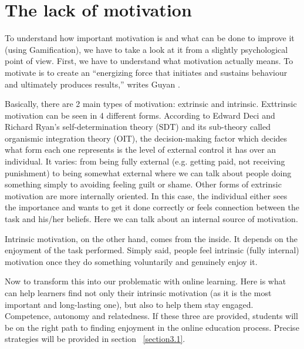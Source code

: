 \documentclass[10pt,english,a4paper]{article}
\begin{document}
\section{The lack of motivation} \label{section2}
	To understand how important motivation is and what can be done to improve it (using Gamification), we have to take a look at it from a slightly psychological point of view. First, we have to understand what motivation actually means. 
	To motivate is to create an “energizing force that initiates and sustains behaviour and ultimately produces results,” writes Guyan \cite{Guyan}. 

	Basically, there are 2 main types of motivation: extrinsic and intrinsic. Exttrinsic motivation can be seen in 4 different forms. 
	According to Edward Deci and Richard Ryan's self-determination theory (SDT) and its sub-theory called organismic integration theory (OIT), the decision-making factor which decides what form each one represents is the level of external control it has over an individual. 
	It varies: from being fully external (e.g. getting paid, not receiving punishment) to being somewhat external where we can talk about people doing something simply to avoiding feeling guilt or shame. Other forms of extrinsic motivation are more internally oriented. 
	In this case, the individual either sees the importance and wants to get it done correctly or feels connection between the task and his/her beliefs. Here we can talk about an internal source of motivation.
	
	Intrinsic motivation, on the other hand, comes from the inside. It depends on the enjoyment of the task performed. Simply said, people feel intrinsic (fully internal) motivation once they do something voluntarily and genuinely enjoy it.

	Now to transform this into our problematic with online learning. Here is what can help learners find not only their intrinsic motivation (as it is the most important and long-lasting one), but also to help them stay engaged. 
	Competence, autonomy and relatedness. If these three are provided, students will be on the right path to finding enjoyment in the online education process.\cite{Guyan} Precise strategies will be provided in section ~\ref{section3.1}.
\end{document}
